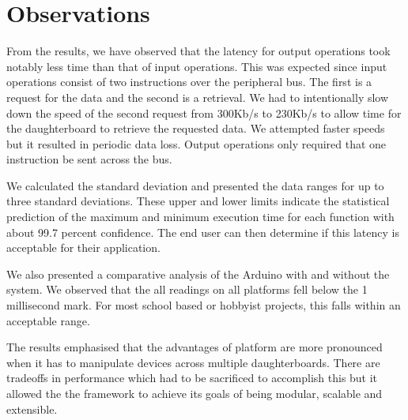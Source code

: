 

\section{Observations} %
\label{sec:Observations}

From the results, we have observed that the latency for output operations took notably less time than that of input operations. This was expected since input operations consist of two instructions over the peripheral bus. The first is a request for the data and the second is a retrieval. We had to intentionally slow down the speed of the second request from 300Kb/s to 230Kb/s to allow time for the daughterboard to retrieve the requested data. We attempted faster speeds but it resulted in periodic data loss. Output operations only required that one instruction be sent across the bus.

We calculated the standard deviation and presented the data ranges for up to three standard deviations. These upper and lower limits indicate the statistical prediction of the maximum and minimum execution time for each function with about 99.7 percent confidence. The end user can then determine if this latency is acceptable for their application.

We also presented a comparative analysis of the Arduino with and without the \xten system. We observed that the all readings on all platforms fell below the 1 millisecond mark. For most school based or hobbyist projects, this falls within an acceptable range.

The results emphasised that the advantages of \xten platform are more pronounced when it has to manipulate devices across multiple daughterboards. There are tradeoffs in performance which had to be sacrificed to accomplish this but it allowed the the framework to achieve its goals of being modular, scalable and extensible.
